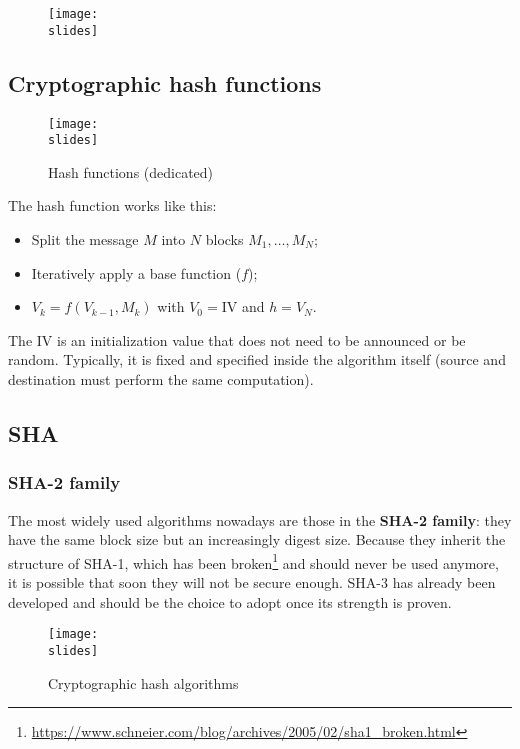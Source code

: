 \begin{figure}[h]
    \centering
    \texttt{[image: \\slides]}
\end{figure}

\subsection{Cryptographic hash functions}
\begin{figure}[h]
    \centering
    \texttt{[image: \\slides]}
    \caption{Hash functions (dedicated)}
\end{figure}
The hash function works like this:
\begin{itemize}
    \item Split the message $M$ into $N$ blocks \(M_1, \ldots, M_N\);
    \item Iteratively apply a base function (\(f\));
    \item \(V_k = f(V_{k-1}, M_k)\) with \(V_0 = \text{IV}\) and \(h = V_N\).
\end{itemize}

The IV is an initialization value that does not need to be announced or be random. Typically, it is fixed and specified inside the algorithm itself (source and destination must perform the same computation).

\subsection*{SHA}

\subsubsection{SHA-2 family}
The most widely used algorithms nowadays are those in the \textbf{SHA-2 family}: they have the same block size but an increasingly digest size. Because they inherit the structure of SHA-1, which has been broken\footnote{\url{https://www.schneier.com/blog/archives/2005/02/sha1_broken.html}} and should never be used anymore, it is possible that soon they will not be secure enough.
SHA-3 has already been developed and should be the choice to adopt once its strength is proven.

\begin{figure}[h]
    \centering
    \texttt{[image: \\slides]}
    \caption{Cryptographic hash algorithms}
\end{figure}


